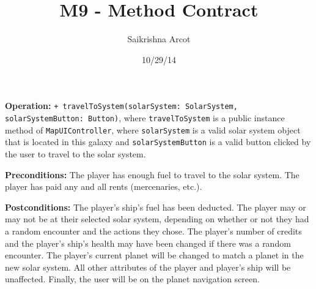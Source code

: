 \documentclass{article}
\title{M9 - Method Contract}
\date{10/29/14}
\author{Saikrishna Arcot}
\begin{document}
\maketitle

\textbf{Operation:} \texttt{+ travelToSystem(solarSystem: SolarSystem, solarSystemButton: Button)}, where \texttt{travelToSystem} is a public instance method of \texttt{MapUIController}, where \texttt{solarSystem} is a valid solar system object that is located in this galaxy and \texttt{solarSystemButton} is a valid button clicked by the user to travel to the solar system.

\textbf{Preconditions:} The player has enough fuel to travel to the solar system. The player has paid any and all rents (mercenaries, etc.).

\textbf{Postconditions:} The player's ship's fuel has been deducted. The player may or may not be at their selected solar system, depending on whether or not they had a random encounter and the actions they chose. The player's number of credits and the player's ship's health may have been changed if there was a random encounter. The player's current planet will be changed to match a planet in the new solar system. All other attributes of the player and player's ship will be unaffected. Finally, the user will be on the planet navigation screen.
\end{document}
